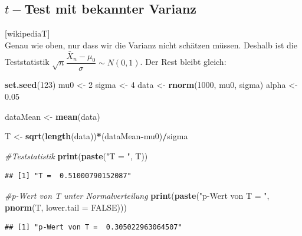 \documentclass[]{article}
\newenvironment{Shaded}{\begin{snugshade}}{\end{snugshade}}
\newcommand{\CommentTok}[1]{\textcolor[rgb]{0.56,0.35,0.01}{\textit{#1}}}
\newcommand{\DataTypeTok}[1]{\textcolor[rgb]{0.13,0.29,0.53}{#1}}
\newcommand{\DecValTok}[1]{\textcolor[rgb]{0.00,0.00,0.81}{#1}}
\newcommand{\FloatTok}[1]{\textcolor[rgb]{0.00,0.00,0.81}{#1}}
\newcommand{\KeywordTok}[1]{\textcolor[rgb]{0.13,0.29,0.53}{\textbf{#1}}}
\newcommand{\NormalTok}[1]{#1}
\newcommand{\OperatorTok}[1]{\textcolor[rgb]{0.81,0.36,0.00}{\textbf{#1}}}
\newcommand{\OtherTok}[1]{\textcolor[rgb]{0.56,0.35,0.01}{#1}}
\newcommand{\StringTok}[1]{\textcolor[rgb]{0.31,0.60,0.02}{#1}}
\begin{document}
\hypertarget{t-test-mit-bekannter-varianz}{%
\subsection{\texorpdfstring{\(t-\)Test mit bekannter Varianz}{t-Test mit bekannter Varianz}}\label{t-test-mit-bekannter-varianz}}

{[}wikipediaT{]}\\
Genau wie oben, nur dass wir die Varianz nicht schätzen müssen.
Deshalb ist die Teststatistik \(\sqrt{n}\dfrac{\bar X_n-\mu_0}{\sigma}\sim N(0,1)\).
Der Rest bleibt gleich:

\begin{Shaded}
\begin{Highlighting}[]
\KeywordTok{set.seed}\NormalTok{(}\DecValTok{123}\NormalTok{)}
\NormalTok{mu0 <-}\StringTok{ }\DecValTok{2}
\NormalTok{sigma <-}\StringTok{ }\DecValTok{4}
\NormalTok{data <-}\StringTok{ }\KeywordTok{rnorm}\NormalTok{(}\DecValTok{1000}\NormalTok{, mu0, sigma)}
\NormalTok{alpha <-}\StringTok{ }\FloatTok{0.05}

\NormalTok{dataMean <-}\StringTok{ }\KeywordTok{mean}\NormalTok{(data)}

\NormalTok{T <-}\StringTok{ }\KeywordTok{sqrt}\NormalTok{(}\KeywordTok{length}\NormalTok{(data))}\OperatorTok{*}\NormalTok{(dataMean}\OperatorTok{-}\NormalTok{mu0)}\OperatorTok{/}\NormalTok{sigma}

\CommentTok{#Teststatistik}
\KeywordTok{print}\NormalTok{(}\KeywordTok{paste}\NormalTok{(}\StringTok{"T = "}\NormalTok{, T))}
\end{Highlighting}
\end{Shaded}

\begin{verbatim}
## [1] "T =  0.51000790152087"
\end{verbatim}

\begin{Shaded}
\begin{Highlighting}[]
\CommentTok{#p-Wert von T unter Normalverteilung}
\KeywordTok{print}\NormalTok{(}\KeywordTok{paste}\NormalTok{(}\StringTok{"p-Wert von T = "}\NormalTok{, }\KeywordTok{pnorm}\NormalTok{(T, }\DataTypeTok{lower.tail =} \OtherTok{FALSE}\NormalTok{)))}
\end{Highlighting}
\end{Shaded}

\begin{verbatim}
## [1] "p-Wert von T =  0.305022963064507"
\end{verbatim}
\end{document}
